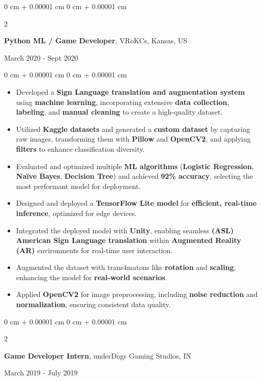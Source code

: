 \documentclass[10pt, letterpaper]{article}
\newenvironment{highlights}{
    \begin{itemize}[
        topsep=0.10 cm,
        parsep=0.10 cm,
        partopsep=0pt,
        itemsep=0pt,
        leftmargin=0 cm + 10pt
    ]
}{
    \end{itemize}
} %
\newenvironment{onecolentry}{
    \begin{adjustwidth}{
        0 cm + 0.00001 cm
    }{
        0 cm + 0.00001 cm
    }
}{
    \end{adjustwidth}
} %
\newenvironment{twocolentry}[2][]{
    \onecolentry
    \def\secondColumn{#2}
    \setcolumnwidth{\fill, 4.5 cm}
    \begin{paracol}{2}
}{
    \switchcolumn \raggedleft \secondColumn
    \end{paracol}
    \endonecolentry
} %
\begin{document}
\vspace{0.15 cm}
\begin{twocolentry}{
		March 2020 - Sept 2020
	}
	\textbf{Python ML / Game Developer}, VRoKCs, Kansas, US
\end{twocolentry}
\begin{onecolentry}
	\begin{highlights}
		\item Developed a \textbf{Sign Language translation and augmentation system} using \textbf{machine learning}, incorporating extensive \textbf{data collection}, \textbf{labeling}, and \textbf{manual cleaning} to create a high-quality dataset.
		\item Utilized \textbf{Kaggle datasets} and generated a \textbf{custom dataset} by capturing raw images, transforming them with \textbf{Pillow} and \textbf{OpenCV2}, and applying \textbf{filters} to enhance classification diversity.
		\item Evaluated and optimized multiple \textbf{ML algorithms} (\textbf{Logistic Regression}, \textbf{Naïve Bayes}, \textbf{Decision Tree}) and achieved \textbf{92\% accuracy}, selecting the most performant model for deployment.
		\item Designed and deployed a \textbf{TensorFlow Lite model} for \textbf{efficient, real-time inference}, optimized for edge devices.
		\item Integrated the deployed model with \textbf{Unity}, enabling seamless \textbf{(ASL) American Sign Language translation} within \textbf{Augmented Reality (AR)} environments for real-time user interaction.
		\item Augmented the dataset with trans4matons like \textbf{rotation} and \textbf{scaling}, enhancing the model for \textbf{real-world scenarios}.
		\item Applied \textbf{OpenCV2} for image preprocessing, including \textbf{noise reduction} and \textbf{normalization}, ensuring consistent data quality.
	\end{highlights}
\end{onecolentry}




\vspace{0.15 cm}
\begin{twocolentry}{
		March 2019 - July 2019
	}
	\textbf{Game Developer Intern}, underDogs Gaming Studios, IN
\end{twocolentry}
\end{document}
